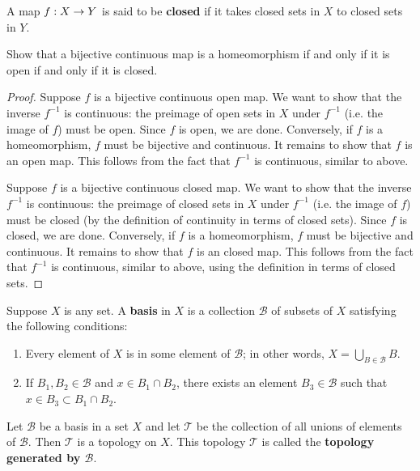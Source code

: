 \documentclass{mathnotes}
\begin{document}
\begin{defn}
    A map $f:X\rightarrow Y$ is said to be \textbf{closed} if it takes closed sets in $X$ to closed sets in $Y$.
\end{defn}

\begin{exc}
    Show that a bijective continuous map is a homeomorphism if and only if it is open if and only if it is closed.
\end{exc}
\begin{proof}
    Suppose $f$ is a bijective continuous open map. We want to show that the inverse $f^{-1}$ is continuous: the preimage of open sets in $X$ under
    $f^{-1}$ (i.e. the image of $f$) must be open. Since $f$ is open, we are done. Conversely, if $f$ is a homeomorphism, $f$ must be bijective
    and continuous. It remains to show that $f$ is an open map. This follows from the fact that $f^{-1}$ is continuous, similar to above.

    Suppose $f$ is a bijective continuous closed map. We want to show that the inverse $f^{-1}$ is continuous: the preimage of closed sets in $X$ under
    $f^{-1}$ (i.e. the image of $f$) must be closed (by the definition of continuity in terms of closed sets). Since $f$ is closed, we are done.
    Conversely, if $f$ is a homeomorphism, $f$ must be bijective and continuous. It remains to show that $f$ is an closed map. This follows from
    the fact that $f^{-1}$ is continuous, similar to above, using the definition in terms of closed sets.
\end{proof}


\begin{defn}
    Suppose $X$ is any set. A \textbf{basis} in $X$ is a collection $\mathcal{B}$ of subsets of $X$ satisfying the following conditions:
    \begin{enumerate}
        \item Every element of $X$ is in some element of $\mathcal{B}$; in other words, $X=\bigcup_{B\in \mathcal{B}}B$.
        \item If $B_1, B_2\in\mathcal{B}$ and $x\in B_1\cap B_2$, there exists an element $B_3\in \mathcal{B}$ such that
            $x\in B_3\subset B_1\cap B_2$.
    \end{enumerate}
\end{defn}

\begin{thm}
    Let $\mathcal{B}$ be a basis in a set $X$ and let $\mathcal{T}$ be the collection of all unions of elements of $\mathcal{B}$.
    Then $\mathcal{T}$ is a topology on $X$. This topology $\mathcal{T}$ is called the \textbf{topology generated by $\mathcal{B}$}.
\end{thm}
\end{document}
